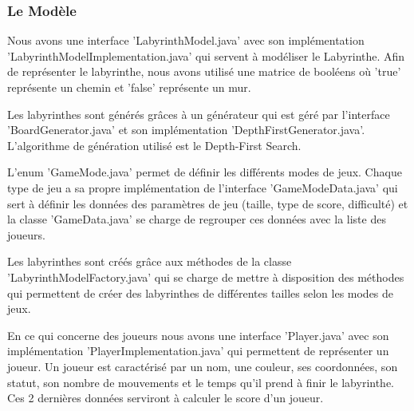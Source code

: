 \subsubsection{Le Modèle}
\label{subsubsec:modele}

Nous avons une interface 'LabyrinthModel.java' avec son implémentation 'LabyrinthModelImplementation.java' qui servent à modéliser le Labyrinthe. Afin de représenter le labyrinthe, nous avons utilisé une matrice de booléens où 'true' représente un chemin et 'false' représente un mur.

Les labyrinthes sont générés grâces à un générateur qui est géré par l'interface 'BoardGenerator.java' et son implémentation 'DepthFirstGenerator.java'. L'algorithme de génération utilisé est le Depth-First Search.

L'enum 'GameMode.java' permet de définir les différents modes de jeux. Chaque type de jeu a sa propre implémentation de l'interface 'GameModeData.java' qui sert à définir les données des paramètres de jeu (taille, type de score, difficulté) et la classe 'GameData.java' se charge de regrouper ces données avec la liste des joueurs.

Les labyrinthes sont créés grâce aux méthodes de la classe 'LabyrinthModelFactory.java' qui se charge de mettre à disposition des méthodes qui permettent de créer des labyrinthes de différentes tailles selon les modes de jeux.

En ce qui concerne des joueurs nous avons une interface 'Player.java' avec son implémentation 'PlayerImplementation.java' qui permettent de représenter un joueur. Un joueur est caractérisé par un nom, une couleur, ses coordonnées, son statut, son nombre de mouvements et le temps qu'il prend à finir le labyrinthe. Ces 2 dernières données serviront à calculer le score d'un joueur.

